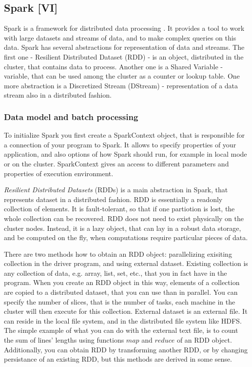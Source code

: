 \subsection{Spark [VI]}

Spark is a framework for distributed data processing \cite{Zaharia2010} \cite{Zaharia2013} \cite{Spark1} \cite{Spark2}.
It provides a tool to work with large datasets and streams of data, and to make complex queries on this data.
Spark has several abstractions for representation of data and streams.
The first one - Resilient Distributed Dataset (RDD) - is an object, distributed in the cluster, that contains data to process.
Another one is a Shared Variable - variable, that can be used among the cluster as a counter or lookup table.
One more abstraction is a Discretized Stream (DStream) - representation of a data stream also in a distributed fashion.

\subsubsection{Data model and batch processing}

To initialize Spark you first create a SparkContext object, that is responsible for a connection of your program to Spark.
It allows to specify properties of your application, and also options of how Spark should run, for example in local mode or on the cluster.
SparkContext gives an access to different parameters and properties of execution environment.

\textit{Resilient Distributed Datasets} (RDDs) is a main abstraction in Spark, that represents dataset in a distributed fashion.
RDD is essentially a readonly collection of elements.
It is fault-tolerant, so that if one partiotion is lost, the whole collection can be recovered.
RDD does not need to exist physically on the cluster nodes.
Instead, it is a lazy object, that can lay in a robust data storage, and be computed on the fly, when computations require particular pieces of data.

There are two methods how to obtain an RDD object: parallelizing exisiting collection in the driver program, and using external dataset.
Existing collection is any collection of data, e.g. array, list, set, etc., that you in fact have in the program.
When you create an RDD object in this way, elements of a collection are copied to a distributed dataset, that you can use than in parallel.
You can specify the number of slices, that is the number of tasks, each machine in the cluster will then execute for this collection.
External dataset is an external file.
It can reside in the local file system, and in the distributed file system like HDFS.
The simple example of what you can do with the external text file, is to count the sum of lines' lengths using functions $map$ and $reduce$ of an RDD object. 
Additionally, you can obtain RDD by transforming another RDD, or by changing persistance of an existing RDD, but this methods are derived in some sense.

